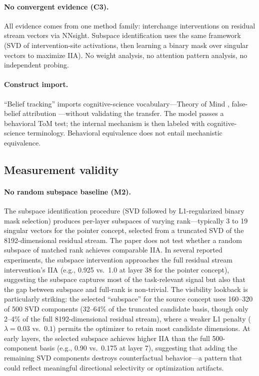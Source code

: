 \documentclass[11pt]{article}
\begin{document}
\paragraph{No convergent evidence (C3).}
All evidence comes from one method family: interchange interventions on residual stream vectors via NNsight. Subspace identification uses the same framework (SVD of intervention-site activations, then learning a binary mask over singular vectors to maximize IIA). No weight analysis, no attention pattern analysis, no independent probing.

\paragraph{Construct import.}
``Belief tracking'' imports cognitive-science vocabulary---Theory of Mind \citep{premack1978chimpanzee}, false-belief attribution \citep{wimmer1983beliefs}---without validating the transfer. The model passes a behavioral ToM test; the internal mechanism is then labeled with cognitive-science terminology. Behavioral equivalence does not entail mechanistic equivalence.

\subsection{Measurement validity}

\paragraph{No random subspace baseline (M2).}
The subspace identification procedure (SVD followed by L1-regularized binary mask selection) produces per-layer subspaces of varying rank---typically 3 to 19 singular vectors for the pointer concept, selected from a truncated SVD of the 8192-dimensional residual stream. The paper does not test whether a random subspace of matched rank achieves comparable IIA. In several reported experiments, the subspace intervention approaches the full residual stream intervention's IIA (e.g., 0.925 vs.\ 1.0 at layer 38 for the pointer concept), suggesting the subspace captures most of the task-relevant signal but also that the gap between subspace and full-rank is non-trivial. The visibility lookback is particularly striking: the selected ``subspace'' for the source concept uses 160--320 of 500 SVD components (32--64\% of the truncated candidate basis, though only 2--4\% of the full 8192-dimensional residual stream), where a weaker L1 penalty ($\lambda = 0.03$ vs.\ $0.1$) permits the optimizer to retain most candidate dimensions. At early layers, the selected subspace achieves higher IIA than the full 500-component basis (e.g., 0.90 vs.\ 0.175 at layer 7), suggesting that adding the remaining SVD components destroys counterfactual behavior---a pattern that could reflect meaningful directional selectivity or optimization artifacts.
\end{document}
